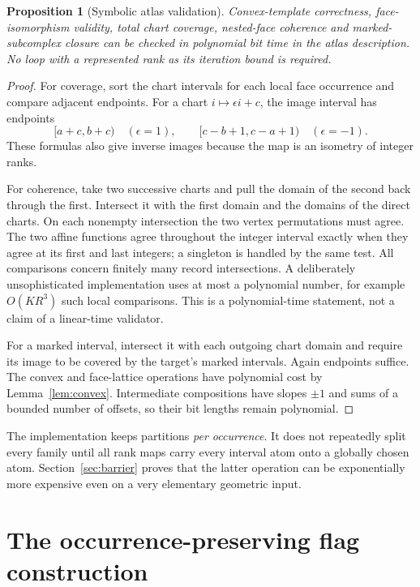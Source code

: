\documentclass[11pt]{article}
\newtheorem{proposition}[theorem]{Proposition}
\theoremstyle{definition}\newtheorem{definition}[theorem]{Definition}
\theoremstyle{remark}\newtheorem{remark}[theorem]{Remark}
\begin{document}
\begin{proposition}[Symbolic atlas validation]\label{prop:validation}
Convex-template correctness, face-isomorphism validity, total chart coverage, nested-face coherence and marked-subcomplex closure can be checked in polynomial bit time in the atlas description. No loop with a represented rank as its iteration bound is required.
\end{proposition}
\begin{proof}
For coverage, sort the chart intervals for each local face occurrence and compare adjacent endpoints. For a chart \(i\mapsto\epsilon i+c\), the image interval has endpoints
\[
 [a+c,b+c)\quad(\epsilon=1),\qquad
 [c-b+1,c-a+1)\quad(\epsilon=-1).
\]
These formulas also give inverse images because the map is an isometry of integer ranks.

For coherence, take two successive charts and pull the domain of the second back through the first. Intersect it with the first domain and the domains of the direct charts. On each nonempty intersection the two vertex permutations must agree. The two affine functions agree throughout the integer interval exactly when they agree at its first and last integers; a singleton is handled by the same test. All comparisons concern finitely many record intersections. A deliberately unsophisticated implementation uses at most a polynomial number, for example \(O(KR^3)\) such local comparisons. This is a polynomial-time statement, not a claim of a linear-time validator.

For a marked interval, intersect it with each outgoing chart domain and require its image to be covered by the target's marked intervals. Again endpoints suffice. The convex and face-lattice operations have polynomial cost by Lemma~\ref{lem:convex}. Intermediate compositions have slopes \(\pm1\) and sums of a bounded number of offsets, so their bit lengths remain polynomial.
\end{proof}

The implementation keeps partitions \emph{per occurrence}. It does not repeatedly split every family until all rank maps carry every interval atom onto a globally chosen atom. Section~\ref{sec:barrier} proves that the latter operation can be exponentially more expensive even on a very elementary geometric input.

\section{The occurrence-preserving flag construction}
\label{sec:construction}
\end{document}

